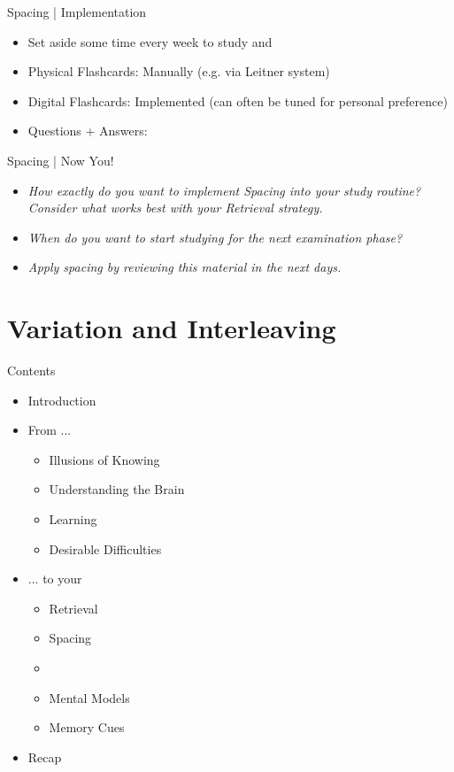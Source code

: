 \documentclass{ercisbeamer}
\begin{document}
\begin{frame}{Spacing | Implementation}
    \begin{itemize}
        \item Set aside some time every week  to study and 
        \item Physical Flashcards: Manually (e.g. via Leitner system)
        \item Digital Flashcards: Implemented  (can often be tuned for personal preference)
        \item Questions + Answers: 
    \end{itemize}
\end{frame}

\begin{frame}{Spacing | Now You!}
    \begin{itemize}
        \item \emph{How exactly do you want to implement Spacing into your study routine? \\ Consider what works best with your Retrieval strategy.}
        \item \emph{When do you want to start studying for the next examination phase?}
        \item \emph{Apply spacing by reviewing this material in the next days.}
    \end{itemize}
\end{frame}

\section{Variation and Interleaving}
\begin{frame}{Contents}
    \begin{itemize}
        \item Introduction
        \item From ...
        \begin{itemize}
            \item Illusions of Knowing
            \item Understanding the Brain
            \item Learning
            \item Desirable Difficulties
        \end{itemize}
        \item ... to your 
        \begin{itemize}
            \item Retrieval
            \item Spacing
            \item {}
            \item Mental Models
            \item Memory Cues
        \end{itemize}
        \item Recap
    \end{itemize}
\end{frame}
\end{document}
